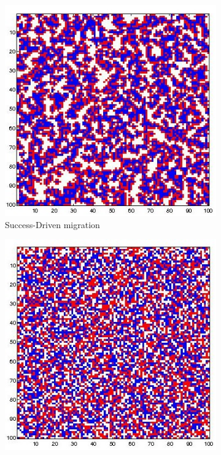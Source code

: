 \documentclass[11pt]{article}
\begin{document}
\begin{figure}[h]
	\centering
	\begin{subfigure}[t]{0.3\textwidth}
        \includegraphics[width=\textwidth]{../../other/grids/m1-t200-a5-g300.jpg}
	\caption{Success-Driven migration}
	\label{fig:grids_no_imitation1}
    	\end{subfigure}
	\begin{subfigure}[t]{0.3\textwidth}
        \includegraphics[width=\textwidth]{../../other/grids/m4-t200-a5-g300.jpg}

\end{subfigure}
\end{figure}
\end{document}
